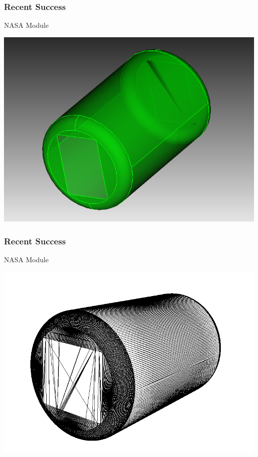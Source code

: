 \documentclass[14pt]{beamer}
\begin{document}
\begin{frame}
\frametitle{Recent Success}

NASA Module
\begin{center}
\includegraphics[scale=0.35]{bad_faceting.png}
\end{center}
\end{frame}

\begin{frame}
\frametitle{Recent Success}

NASA Module
\begin{center}
\includegraphics[scale=0.35]{bad_facets.png}
\end{center}
\end{frame}
\end{document}
